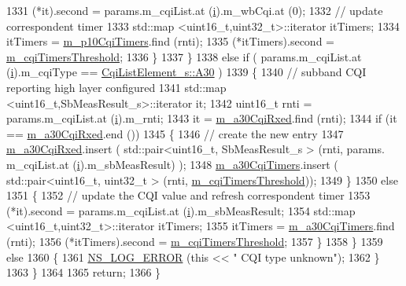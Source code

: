 \begin{DoxyCode}
1331               (*it).second = params.m\_cqiList.at (\hyperlink{bernuolliDistribution_8m_a6f6ccfcf58b31cb6412107d9d5281426}{i}).m\_wbCqi.at (0);
1332               \textcolor{comment}{// update correspondent timer}
1333               std::map <uint16\_t,uint32\_t>::iterator itTimers;
1334               itTimers = \hyperlink{classns3_1_1FdMtFfMacScheduler_a5dc227f7ca1e00c530063e52ec1dcc69}{m\_p10CqiTimers}.find (rnti);
1335               (*itTimers).second = \hyperlink{classns3_1_1FdMtFfMacScheduler_a2594d67e25a125c89b90a5eba5e46cc9}{m\_cqiTimersThreshold};
1336             \}
1337         \}
1338       \textcolor{keywordflow}{else} \textcolor{keywordflow}{if} ( params.m\_cqiList.at (\hyperlink{bernuolliDistribution_8m_a6f6ccfcf58b31cb6412107d9d5281426}{i}).m\_cqiType == \hyperlink{structns3_1_1CqiListElement__s_a8f1bd827fd9842e7c07e39265d88299aab9a9d64494e36c89d7932a00edb056a7}{CqiListElement\_s::A30} )
1339         \{
1340           \textcolor{comment}{// subband CQI reporting high layer configured}
1341           std::map <uint16\_t,SbMeasResult\_s>::iterator it;
1342           uint16\_t rnti = params.m\_cqiList.at (\hyperlink{bernuolliDistribution_8m_a6f6ccfcf58b31cb6412107d9d5281426}{i}).m\_rnti;
1343           it = \hyperlink{classns3_1_1FdMtFfMacScheduler_a21ff76bdadf27aac3b87c43f3bc343c8}{m\_a30CqiRxed}.find (rnti);
1344           \textcolor{keywordflow}{if} (it == \hyperlink{classns3_1_1FdMtFfMacScheduler_a21ff76bdadf27aac3b87c43f3bc343c8}{m\_a30CqiRxed}.end ())
1345             \{
1346               \textcolor{comment}{// create the new entry}
1347               \hyperlink{classns3_1_1FdMtFfMacScheduler_a21ff76bdadf27aac3b87c43f3bc343c8}{m\_a30CqiRxed}.insert ( std::pair<uint16\_t, SbMeasResult\_s > (rnti, params.
      m\_cqiList.at (\hyperlink{bernuolliDistribution_8m_a6f6ccfcf58b31cb6412107d9d5281426}{i}).m\_sbMeasResult) );
1348               \hyperlink{classns3_1_1FdMtFfMacScheduler_aea94c05a4b2c5c5392ae3fc2d8b6cd44}{m\_a30CqiTimers}.insert ( std::pair<uint16\_t, uint32\_t > (rnti, 
      \hyperlink{classns3_1_1FdMtFfMacScheduler_a2594d67e25a125c89b90a5eba5e46cc9}{m\_cqiTimersThreshold}));
1349             \}
1350           \textcolor{keywordflow}{else}
1351             \{
1352               \textcolor{comment}{// update the CQI value and refresh correspondent timer}
1353               (*it).second = params.m\_cqiList.at (\hyperlink{bernuolliDistribution_8m_a6f6ccfcf58b31cb6412107d9d5281426}{i}).m\_sbMeasResult;
1354               std::map <uint16\_t,uint32\_t>::iterator itTimers;
1355               itTimers = \hyperlink{classns3_1_1FdMtFfMacScheduler_aea94c05a4b2c5c5392ae3fc2d8b6cd44}{m\_a30CqiTimers}.find (rnti);
1356               (*itTimers).second = \hyperlink{classns3_1_1FdMtFfMacScheduler_a2594d67e25a125c89b90a5eba5e46cc9}{m\_cqiTimersThreshold};
1357             \}
1358         \}
1359       \textcolor{keywordflow}{else}
1360         \{
1361           \hyperlink{group__logging_ga0261a8db1d4ac5f79417d117634fd455}{NS\_LOG\_ERROR} (\textcolor{keyword}{this} << \textcolor{stringliteral}{" CQI type unknown"});
1362         \}
1363     \}
1364 
1365   \textcolor{keywordflow}{return};
1366 \}
\end{DoxyCode}


